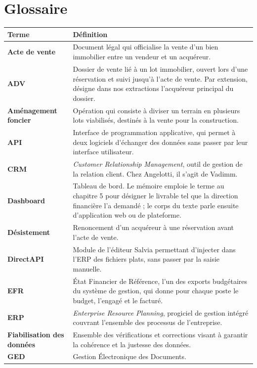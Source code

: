 \section*{Glossaire}
\vspace{1em}
\begin{longtable}{p{4cm} p{11cm}}
\textbf{Terme} & \textbf{Définition} \\
\hline
\endhead
\textbf{Acte de vente} & Document légal qui officialise la vente d'un bien immobilier entre un vendeur et un acquéreur. \\
\textbf{ADV} & Dossier de vente lié à un lot immobilier, ouvert lors d'une réservation et suivi jusqu'à l'acte de vente. Par extension, désigne dans nos extractions l'acquéreur principal du dossier. \\
\textbf{Aménagement foncier} & Opération qui consiste à diviser un terrain en plusieurs lots viabilisés, destinés à la vente pour la construction. \\
\textbf{API} & Interface de programmation applicative, qui permet à deux logiciels d'échanger des données sans passer par leur interface utilisateur. \\
\textbf{CRM} & \emph{Customer Relationship Management}, outil de gestion de la relation client. Chez Angelotti, il s'agit de Vadimm. \\
\textbf{Dashboard} & Tableau de bord. Le mémoire emploie le terme au chapitre 5 pour désigner le livrable tel que la direction financière l'a demandé ; le corps du texte parle ensuite d'application web ou de plateforme. \\
\textbf{Désistement} & Renoncement d'un acquéreur à une réservation avant l'acte de vente. \\
\textbf{DirectAPI} & Module de l'éditeur Salvia permettant d'injecter dans l'ERP des fichiers plats, sans passer par la saisie manuelle. \\
\textbf{EFR} & État Financier de Référence, l'un des exports budgétaires du système de gestion, qui donne pour chaque poste le budget, l'engagé et le facturé. \\
\textbf{ERP} & \emph{Enterprise Resource Planning}, progiciel de gestion intégré couvrant l'ensemble des processus de l'entreprise. \\
\textbf{Fiabilisation des données} & Ensemble des vérifications et corrections visant à garantir la cohérence et la justesse des données. \\
\textbf{GED} & Gestion Électronique des Documents. \\

\end{longtable}
